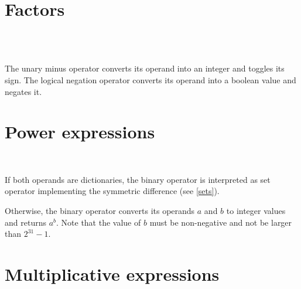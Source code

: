 \section{Factors}

\begin{grammar}
      \produces {} \\
      \produces \lextoken{-}  \\
      \produces \lextoken{!} 
\end{grammar}

\noindent
The unary minus operator \token{-} converts its operand into an integer
and toggles its sign. The logical negation operator \token{!} converts
its operand into a boolean value and negates it.

\section{Power expressions}

\begin{grammar}
      \produces {} \\
      \produces {}
         \lextoken{\caretSY} 
\end{grammar}

\noindent
If both operands are dictionaries, the binary operator \token{\caretSY}
is interpreted as set operator implementing the symmetric difference
(see \ref{sets}).

Otherwise, the binary operator \token{\caretSY} converts its operands
$a$ and $b$ to integer values and returns $a^b$. Note that
the value of $b$ must be non-negative and not be larger than $2^{31}-1$.

\section{Multiplicative expressions}

\begin{grammar}
      \produces {} \\
      \produces {}
         \lextoken{*}  \\
      \produces {}
           \\
      \produces {}
          
\end{grammar}

